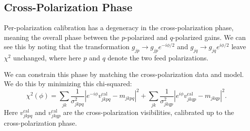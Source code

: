 \documentclass{article}
\begin{document}
\subsection{Cross-Polarization Phase}

Per-polarization calibration has a degeneracy in the cross-polarization phase, meaning the overall phase between the $p$-polarized and $q$-polarized gains. We can see this by noting that the transformation $g_{jp} \rightarrow g_{jp} e^{-i\phi/2}$ and $g_{jq} \rightarrow g_{jq} e^{i\phi/2}$ leave $\chi^2$ unchanged, where here $p$ and $q$ denote the two feed polarizations.

We can constrain this phase by matching the cross-polarization data and model. We do this by minimizing this chi-squared:
\begin{equation}
\chi^2(\phi) = \sum_{jk} \frac{1}{\sigma^2_{jkpq}} \left| e^{-i\phi} v^\text{cal}_{jkpq} - m_{jkpq} \right|^2 + \sum_{jk} \frac{1}{\sigma^2_{jkqp}} \left| e^{i\phi} v^\text{cal}_{jkqp} - m_{jkqp} \right|^2.
\end{equation}
Here $v^\text{cal}_{jkpq}$ and $v^\text{cal}_{jkqp}$ are the cross-polarization visibilities, calibrated up to the cross-polarization phase.
\end{document}

